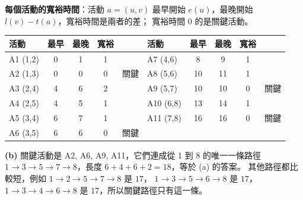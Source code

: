 \begin{pastsoln}
\textbf{每個活動的寬裕時間}：活動 $a = (u, v)$ 最早開始 $e(u)$，最晚開始 $l(v) - t(a)$，寬裕時間是兩者的差；
寬裕時間 $0$ 的是關鍵活動。
\begin{center}
\small
\begin{tabular}{lcccc|lcccc}
\toprule
活動 & 最早 & 最晚 & 寬裕 & & 活動 & 最早 & 最晚 & 寬裕 & \\
\midrule
A1 (1,2) & 0 & 1 & 1 & & A7 (4,6) & 8 & 9 & 1 & \\
A2 (1,3) & 0 & 0 & 0 & 關鍵 & A8 (5,6) & 10 & 11 & 1 & \\
A3 (2,4) & 4 & 6 & 2 & & A9 (5,7) & 10 & 10 & 0 & 關鍵 \\
A4 (2,5) & 4 & 5 & 1 & & A10 (6,8) & 13 & 14 & 1 & \\
A5 (3,4) & 6 & 7 & 1 & & A11 (7,8) & 16 & 16 & 0 & 關鍵 \\
A6 (3,5) & 6 & 6 & 0 & 關鍵 & & & & & \\
\bottomrule
\end{tabular}
\end{center}

\textbf{(b)} 關鍵活動是 A2, A6, A9, A11，它們連成從 1 到 8 的唯一一條路徑 $1 \to 3 \to 5 \to 7 \to 8$，長度
$6 + 4 + 6 + 2 = 18$，等於 (a) 的答案。 其他路徑都比較短，例如 $1 \to 2 \to 5 \to 7 \to 8$ 是 $17$，
$1 \to 3 \to 5 \to 6 \to 8$ 是 $17$，$1 \to 3 \to 4 \to 6 \to 8$ 是 $17$，所以關鍵路徑只有這一條。
\end{pastsoln}

